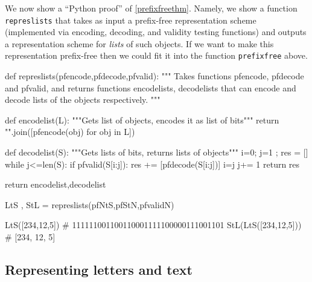 
We now show a ``Python proof'' of \cref{prefixfreethm}. Namely, we show
a function \texttt{represlists} that takes as input a prefix-free
representation scheme (implemented via encoding, decoding, and validity
testing functions) and outputs a representation scheme for \emph{lists}
of such objects. If we want to make this representation prefix-free then
we could fit it into the function \texttt{prefixfree} above.

\begin{code}
def represlists(pfencode,pfdecode,pfvalid):
    """
    Takes functions pfencode, pfdecode and pfvalid,
    and returns functions encodelists, decodelists
    that can encode and decode lists of the objects
    respectively.
    """

    def encodelist(L):
        """Gets list of objects, encodes it as list of bits"""
        return "".join([pfencode(obj) for obj in L])

    def decodelist(S):
        """Gets lists of bits, returns lists of objects"""
        i=0; j=1 ; res = []
        while j<=len(S):
            if pfvalid(S[i:j]):
                res += [pfdecode(S[i:j])]
                i=j
            j+= 1
        return res

    return encodelist,decodelist


LtS , StL = represlists(pfNtS,pfStN,pfvalidN)

LtS([234,12,5])
# 111111001100110001111100000111001101
StL(LtS([234,12,5]))
# [234, 12, 5]
\end{code}

\subsection{Representing letters and
text}\label{Representing-letters-and-}

